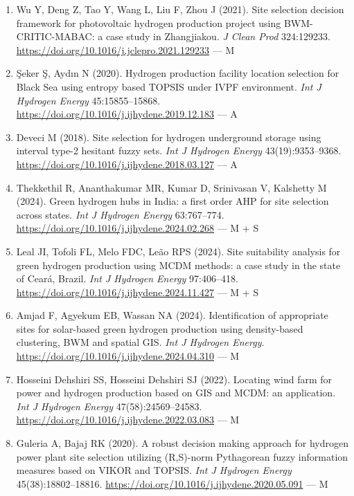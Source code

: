 \documentclass[11pt,a4paper]{article}
\begin{document}
\begin{enumerate}
  \item Wu Y, Deng Z, Tao Y, Wang L, Liu F, Zhou J (2021). Site selection decision framework for photovoltaic hydrogen production project using BWM-CRITIC-MABAC: a case study in Zhangjiakou. \textit{J Clean Prod} 324:129233. \url{https://doi.org/10.1016/j.jclepro.2021.129233} --- M

  \item Şeker Ş, Aydın N (2020). Hydrogen production facility location selection for Black Sea using entropy based TOPSIS under IVPF environment. \textit{Int J Hydrogen Energy} 45:15855--15868. \url{https://doi.org/10.1016/j.ijhydene.2019.12.183} --- A

  \item Deveci M (2018). Site selection for hydrogen underground storage using interval type-2 hesitant fuzzy sets. \textit{Int J Hydrogen Energy} 43(19):9353--9368. \url{https://doi.org/10.1016/j.ijhydene.2018.03.127} --- A

  \item Thekkethil R, Ananthakumar MR, Kumar D, Srinivasan V, Kalshetty M (2024). Green hydrogen hubs in India: a first order AHP for site selection across states. \textit{Int J Hydrogen Energy} 63:767--774. \url{https://doi.org/10.1016/j.ijhydene.2024.02.268} --- M + S

  \item Leal JI, Tofoli FL, Melo FDC, Leão RPS (2024). Site suitability analysis for green hydrogen production using MCDM methods: a case study in the state of Ceará, Brazil. \textit{Int J Hydrogen Energy} 97:406--418. \url{https://doi.org/10.1016/j.ijhydene.2024.11.427} --- M + S

  \item Amjad F, Agyekum EB, Wassan NA (2024). Identification of appropriate sites for solar-based green hydrogen production using density-based clustering, BWM and spatial GIS. \textit{Int J Hydrogen Energy}. \url{https://doi.org/10.1016/j.ijhydene.2024.04.310} --- M

  \item Hosseini Dehshiri SS, Hosseini Dehshiri SJ (2022). Locating wind farm for power and hydrogen production based on GIS and MCDM: an application. \textit{Int J Hydrogen Energy} 47(58):24569--24583. \url{https://doi.org/10.1016/j.ijhydene.2022.03.083} --- M

  \item Guleria A, Bajaj RK (2020). A robust decision making approach for hydrogen power plant site selection utilizing (R,S)-norm Pythagorean fuzzy information measures based on VIKOR and TOPSIS. \textit{Int J Hydrogen Energy} 45(38):18802--18816. \url{https://doi.org/10.1016/j.ijhydene.2020.05.091} --- M


\end{enumerate}
\end{document}
